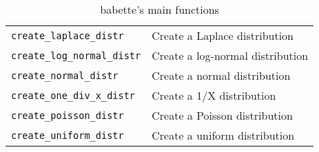 \documentclass{article}
\begin{document}
\begin{table}[h]
\begin{tabular}{ | l | l | }
\verb;create_laplace_distr; & Create a Laplace distribution \\
\verb;create_log_normal_distr; & Create a log-normal distribution \\
\verb;create_normal_distr; & Create a normal distribution \\
\verb;create_one_div_x_distr; & Create a 1/X distribution \\
\verb;create_poisson_distr; & Create a Poisson distribution \\
\verb;create_uniform_distr; & Create a uniform distribution \\
\hline
\end{tabular}
\caption{babette's main functions}
\label{tab:functions}
\end{table}


\end{document}

